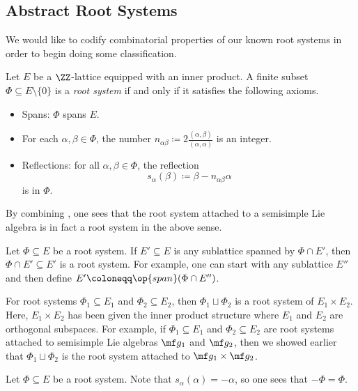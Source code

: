 \documentclass[../notes.tex]{subfiles}
\begin{document}
\subsection{Abstract Root Systems}
We would like to codify combinatorial properties of our known root systems in order to begin doing some classification.
\begin{definition}
	Let $E$ be a $\ZZ$-lattice equipped with an inner product. A finite subset $\Phi\subseteq E\setminus\{0\}$ is a \textit{root system} if and only if it satisfies the following axioms.
	\begin{itemize}
		\item Spans: $\Phi$ spans $E$.
		\item For each $\alpha,\beta\in\Phi$, the number $n_{\alpha\beta}\coloneqq2\frac{(\alpha,\beta)}{(\alpha,\alpha)}$ is an integer.
		\item Reflections: for all $\alpha,\beta\in\Phi$, the reflection
		\[s_\alpha(\beta)\coloneqq\beta-n_{\alpha\beta}\alpha\]
		is in $\Phi$.
	\end{itemize}
\end{definition}
\begin{example}
	By combining , one sees that the root system attached to a semisimple Lie algebra is in fact a root system in the above sense.
\end{example}
\begin{example}
	Let $\Phi\subseteq E$ be a root system. If $E'\subseteq E$ is any sublattice spanned by $\Phi\cap E'$, then $\Phi\cap E'\subseteq E'$ is a root system. For example, one can start with any sublattice $E''$ and then define $E'\coloneqq\op{span}(\Phi\cap E'')$.
\end{example}
\begin{example}
	For root systems $\Phi_1\subseteq E_1$ and $\Phi_2\subseteq E_2$, then $\Phi_1\sqcup\Phi_2$ is a root system of $E_1\times E_2$. Here, $E_1\times E_2$ has been given the inner product structure where $E_1$ and $E_2$ are orthogonal subspaces. For example, if $\Phi_1\subseteq E_1$ and $\Phi_2\subseteq E_2$ are root systems attached to semisimple Lie algebras $\mf g_1$ and $\mf g_2$, then we showed earlier that $\Phi_1\sqcup\Phi_2$ is the root system attached to $\mf g_1\times\mf g_2$.
\end{example}
\begin{remark}
	Let $\Phi\subseteq E$ be a root system. Note that $s_\alpha(\alpha)=-\alpha$, so one sees that $-\Phi=\Phi$.
\end{remark}
\end{document}
